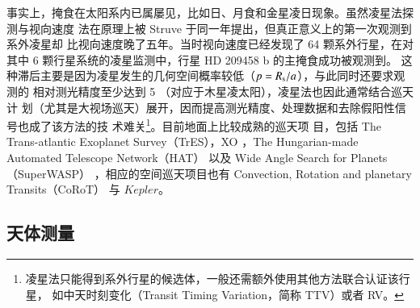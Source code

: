 事实上，掩食在太阳系内已属屡见，比如日、月食和金星凌日现象。虽然凌星法探测与视向速度
法在原理上被 Struve 于同一年提出\cite{Struve1952}，但真正意义上的第一次观测到系外凌星却
比视向速度晚了五年\cite{Seager2010exobook}。当时视向速度已经发现了 64 颗系外行星，在对
其中 6 颗行星系统的凌星监测中，行星 HD 209458 b 的主掩食成功被观测到\cite{Henryetal2000, Charbonneauetal2000}。
这种滞后主要是因为凌星发生的几何空间概率较低（$p = R_\mathrm{s} / a$），与此同时还要求观测的
相对测光精度至少达到 5 \textperthousand（对应于木星凌太阳），凌星法也因此通常结合巡天计
划（尤其是大视场巡天）展开，因而提高测光精度、处理数据和去除假阳性信号也成了该方法的技
术难关\footnote{凌星法只能得到系外行星的候选体，一般还需额外使用其他方法联合认证该行星，
如中天时刻变化（Transit Timing Variation，简称 TTV）或者 RV。}。目前地面上比较成熟的巡天项
目，包括 The Trans-atlantic Exoplanet Survey（TrES）\cite{Alonsoetal2004TrES}，XO
\cite{McCulloughetal2005XO}，The Hungarian-made Automated Telescope Network（HAT）
\cite{Bakosetal2007HAT} 以及 Wide Angle Search for Planets（SuperWASP）
\cite{Pollaccoetal2006WASP}，相应的空间巡天项目也有 Convection, Rotation and planetary 
Transits（CoRoT）\cite{Bargeetal2008CoRoT} 与 $Kepler$\cite{Boruckietal2010}。


\subsection{天体测量}

